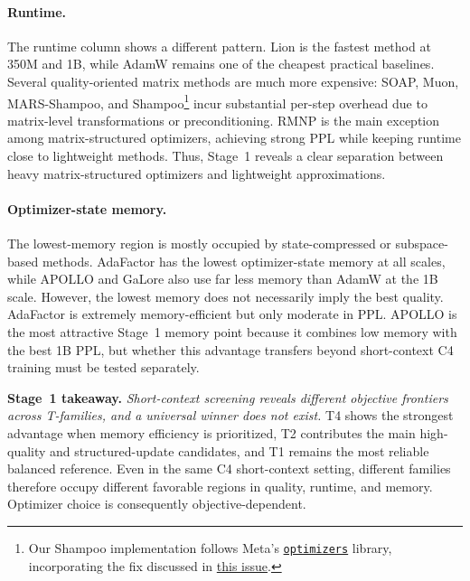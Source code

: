 \paragraph{Runtime.}
The runtime column shows a different pattern. Lion is the fastest method at
350M and 1B, while AdamW remains one of the cheapest practical baselines.
Several quality-oriented matrix methods are much more expensive: SOAP, Muon,
MARS-Shampoo, and Shampoo\footnote{Our Shampoo implementation follows Meta's
\href{https://github.com/facebookresearch/optimizers}{\texttt{optimizers}}
library, incorporating the fix discussed in
\href{https://github.com/facebookresearch/optimizers/issues/265\#issuecomment-4668270192}{this issue}.}
incur substantial per-step overhead due to
matrix-level transformations or preconditioning. RMNP is the main exception
among matrix-structured optimizers, achieving strong PPL while keeping
runtime close to lightweight methods. Thus, Stage~1 reveals a clear separation
between heavy matrix-structured optimizers and lightweight approximations.

\paragraph{Optimizer-state memory.}
The lowest-memory region is mostly occupied by state-compressed or
subspace-based methods. AdaFactor has the
lowest optimizer-state memory at all scales, while APOLLO and GaLore also use
far less memory than AdamW at the 1B scale. However, the lowest memory does not
necessarily imply the best quality. AdaFactor is extremely memory-efficient
but only moderate in PPL. APOLLO is the most attractive Stage~1 memory point
because it combines low memory with the best 1B PPL, but whether this advantage
transfers beyond short-context C4 training must be tested separately.

\begin{takeaway}
\noindent\textbf{Stage~1 takeaway.}
\emph{Short-context screening reveals different objective frontiers across
T-families, and a universal winner does not exist.} T4 shows the strongest advantage
when memory efficiency is prioritized, T2 contributes the main high-quality
and structured-update candidates, and T1 remains the most reliable balanced
reference. Even in the same C4 short-context setting, different families
therefore occupy different favorable regions in quality, runtime, and memory.
Optimizer choice is consequently objective-dependent.
\end{takeaway}


